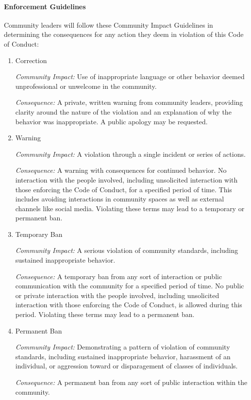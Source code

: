 \paragraph{Enforcement Guidelines}
Community leaders will follow these Community Impact Guidelines in determining
the consequences for any action they deem in violation of this Code of Conduct:
\begin{enumerate}
\item Correction

\textit{Community Impact:} Use of inappropriate language or other behavior deemed
unprofessional or unwelcome in the community.

\textit{Consequence:} A private, written warning from community leaders, providing
clarity around the nature of the violation and an explanation of why the
behavior was inappropriate. A public apology may be requested.
\item Warning

\textit{Community Impact:} A violation through a single incident or series
of actions.

\textit{Consequence:} A warning with consequences for continued behavior. No
interaction with the people involved, including unsolicited interaction with
those enforcing the Code of Conduct, for a specified period of time. This
includes avoiding interactions in community spaces as well as external channels
like social media. Violating these terms may lead to a temporary or
permanent ban.
\item Temporary Ban

\textit{Community Impact:} A serious violation of community standards, including
sustained inappropriate behavior.

\textit{Consequence:} A temporary ban from any sort of interaction or public
communication with the community for a specified period of time. No public or
private interaction with the people involved, including unsolicited interaction
with those enforcing the Code of Conduct, is allowed during this period.
Violating these terms may lead to a permanent ban.
\item Permanent Ban

\textit{Community Impact:} Demonstrating a pattern of violation of community
standards, including sustained inappropriate behavior,  harassment of an
individual, or aggression toward or disparagement of classes of individuals.

\textit{Consequence:} A permanent ban from any sort of public interaction within
the community.
\end{enumerate}

